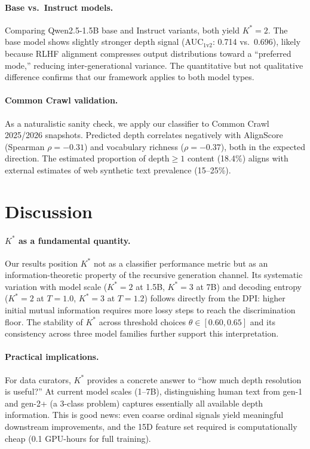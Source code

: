 \documentclass[11pt,a4paper]{article}
\begin{document}
\paragraph{Base vs.\ Instruct models.}
Comparing Qwen2.5-1.5B base and Instruct variants, both yield $K^*{=}2$. The base model shows slightly stronger depth signal (AUC$_{1\text{v}2}$: 0.714 vs.\ 0.696), likely because RLHF alignment compresses output distributions toward a ``preferred mode,'' reducing inter-generational variance. The quantitative but not qualitative difference confirms that our framework applies to both model types.

\paragraph{Common Crawl validation.}
As a naturalistic sanity check, we apply our classifier to Common Crawl 2025/2026 snapshots. Predicted depth correlates negatively with AlignScore (Spearman $\rho{=}{-}0.31$) and vocabulary richness ($\rho{=}{-}0.37$), both in the expected direction. The estimated proportion of depth${\geq}1$ content (18.4\%) aligns with external estimates of web synthetic text prevalence (15--25\%).

\section{Discussion}
\label{sec:discussion}

\paragraph{$K^*$ as a fundamental quantity.}
Our results position $K^*$ not as a classifier performance metric but as an information-theoretic property of the recursive generation channel. Its systematic variation with model scale ($K^*{=}2$ at 1.5B, $K^*{=}3$ at 7B) and decoding entropy ($K^*{=}2$ at $T{=}1.0$, $K^*{=}3$ at $T{=}1.2$) follows directly from the DPI: higher initial mutual information requires more lossy steps to reach the discrimination floor. The stability of $K^*$ across threshold choices $\theta \in [0.60, 0.65]$ and its consistency across three model families further support this interpretation.

\paragraph{Practical implications.}
For data curators, $K^*$ provides a concrete answer to ``how much depth resolution is useful?'' At current model scales (1--7B), distinguishing human text from gen-1 and gen-2+ (a 3-class problem) captures essentially all available depth information. This is good news: even coarse ordinal signals yield meaningful downstream improvements, and the 15D feature set required is computationally cheap (0.1 GPU-hours for full training).
\end{document}
